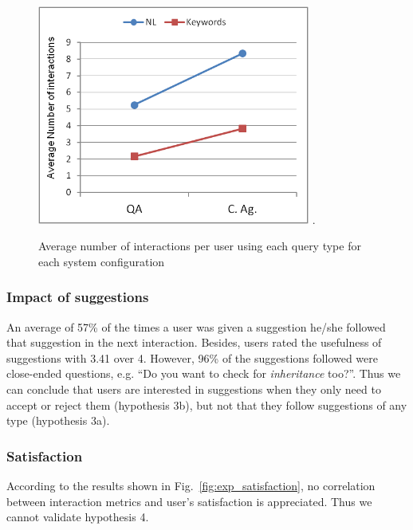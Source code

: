 \begin{figure}[!tbh]
  \centering
  \includegraphics[width=0.8\textwidth]{img/test/exp_querytype.png}
  \DeclareGraphicsExtensions.  
  \caption{Average number of interactions per user using each query type for each system configuration}
  \label{fig:exp_querytype}
\end{figure}

\subsubsection{Impact of suggestions}

An average of 57\% of the times a user was given a suggestion he/she followed that suggestion in the next interaction. Besides, users rated the usefulness of suggestions with 3.41 over 4. However, 96\% of the suggestions followed were close-ended questions, e.g. ``Do you want to check for {\em inheritance} too?''. Thus we can conclude that users are interested in suggestions when they only need to accept or reject them (hypothesis 3b), but not that they follow suggestions of any type (hypothesis 3a). %


\subsubsection{Satisfaction}

According to the results shown in Fig.~\ref{fig:exp_satisfaction}, no correlation between interaction metrics and user's satisfaction is appreciated. Thus we cannot validate hypothesis 4. 

